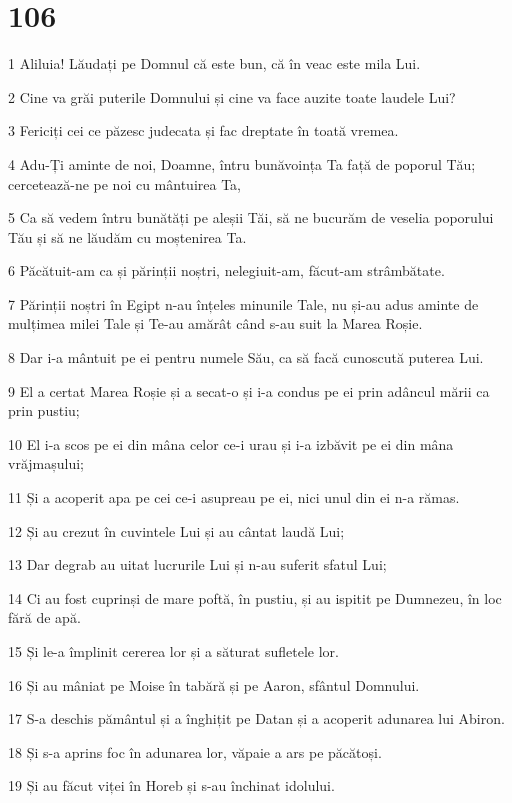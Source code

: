 \chapter{106}

\par 1 Aliluia! Lăudați pe Domnul că este bun, că în veac este mila Lui.
\par 2 Cine va grăi puterile Domnului și cine va face auzite toate laudele Lui?
\par 3 Fericiți cei ce păzesc judecata și fac dreptate în toată vremea.
\par 4 Adu-Ți aminte de noi, Doamne, întru bunăvoința Ta față de poporul Tău; cercetează-ne pe noi cu mântuirea Ta,
\par 5 Ca să vedem întru bunătăți pe aleșii Tăi, să ne bucurăm de veselia poporului Tău și să ne lăudăm cu moștenirea Ta.
\par 6 Păcătuit-am ca și părinții noștri, nelegiuit-am, făcut-am strâmbătate.
\par 7 Părinții noștri în Egipt n-au înțeles minunile Tale, nu și-au adus aminte de mulțimea milei Tale și Te-au amărât când s-au suit la Marea Roșie.
\par 8 Dar i-a mântuit pe ei pentru numele Său, ca să facă cunoscută puterea Lui.
\par 9 El a certat Marea Roșie și a secat-o și i-a condus pe ei prin adâncul mării ca prin pustiu;
\par 10 El i-a scos pe ei din mâna celor ce-i urau și i-a izbăvit pe ei din mâna vrăjmașului;
\par 11 Și a acoperit apa pe cei ce-i asupreau pe ei, nici unul din ei n-a rămas.
\par 12 Și au crezut în cuvintele Lui și au cântat laudă Lui;
\par 13 Dar degrab au uitat lucrurile Lui și n-au suferit sfatul Lui;
\par 14 Ci au fost cuprinși de mare poftă, în pustiu, și au ispitit pe Dumnezeu, în loc fără de apă.
\par 15 Și le-a împlinit cererea lor și a săturat sufletele lor.
\par 16 Și au mâniat pe Moise în tabără și pe Aaron, sfântul Domnului.
\par 17 S-a deschis pământul și a înghițit pe Datan și a acoperit adunarea lui Abiron.
\par 18 Și s-a aprins foc în adunarea lor, văpaie a ars pe păcătoși.
\par 19 Și au făcut viței în Horeb și s-au închinat idolului.
